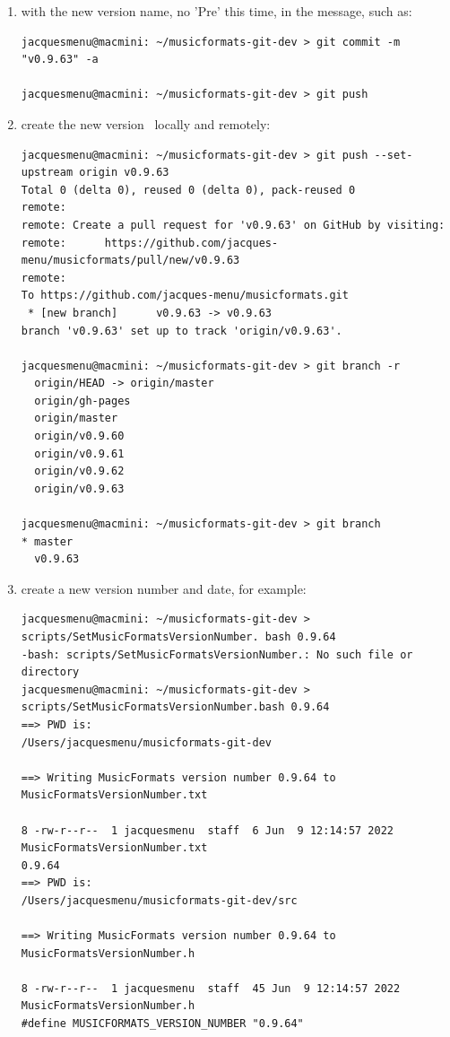 \begin{enumerate}
\item {} with the new version name, no 'Pre' this time, in the  message, such as:
\begin{lstlisting}[language=Terminal]
jacquesmenu@macmini: ~/musicformats-git-dev > git commit -m "v0.9.63" -a

jacquesmenu@macmini: ~/musicformats-git-dev > git push
\end{lstlisting}


\item create the new version \branch\ locally and remotely:
\begin{lstlisting}[language=Terminal]
jacquesmenu@macmini: ~/musicformats-git-dev > git push --set-upstream origin v0.9.63
Total 0 (delta 0), reused 0 (delta 0), pack-reused 0
remote:
remote: Create a pull request for 'v0.9.63' on GitHub by visiting:
remote:      https://github.com/jacques-menu/musicformats/pull/new/v0.9.63
remote:
To https://github.com/jacques-menu/musicformats.git
 * [new branch]      v0.9.63 -> v0.9.63
branch 'v0.9.63' set up to track 'origin/v0.9.63'.

jacquesmenu@macmini: ~/musicformats-git-dev > git branch -r
  origin/HEAD -> origin/master
  origin/gh-pages
  origin/master
  origin/v0.9.60
  origin/v0.9.61
  origin/v0.9.62
  origin/v0.9.63

jacquesmenu@macmini: ~/musicformats-git-dev > git branch
* master
  v0.9.63
\end{lstlisting}


\item create a new version number and date, for example:
\begin{lstlisting}[language=TerminalSmall]
jacquesmenu@macmini: ~/musicformats-git-dev > scripts/SetMusicFormatsVersionNumber. bash 0.9.64
-bash: scripts/SetMusicFormatsVersionNumber.: No such file or directory
jacquesmenu@macmini: ~/musicformats-git-dev > scripts/SetMusicFormatsVersionNumber.bash 0.9.64
==> PWD is:
/Users/jacquesmenu/musicformats-git-dev

==> Writing MusicFormats version number 0.9.64 to MusicFormatsVersionNumber.txt

8 -rw-r--r--  1 jacquesmenu  staff  6 Jun  9 12:14:57 2022 MusicFormatsVersionNumber.txt
0.9.64
==> PWD is:
/Users/jacquesmenu/musicformats-git-dev/src

==> Writing MusicFormats version number 0.9.64 to MusicFormatsVersionNumber.h

8 -rw-r--r--  1 jacquesmenu  staff  45 Jun  9 12:14:57 2022 MusicFormatsVersionNumber.h
#define MUSICFORMATS_VERSION_NUMBER "0.9.64"
\end{lstlisting}


\end{enumerate}
